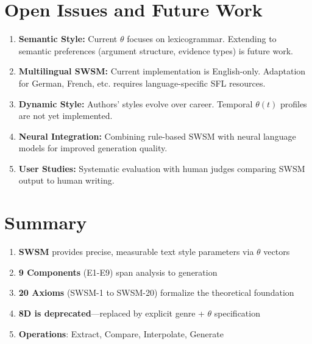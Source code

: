 \section{Open Issues and Future Work}
\label{sec:sw-open}

\begin{enumerate}
    \item \textbf{Semantic Style:} Current $\theta$ focuses on lexicogrammar. Extending to semantic preferences (argument structure, evidence types) is future work.
    \item \textbf{Multilingual SWSM:} Current implementation is English-only. Adaptation for German, French, etc. requires language-specific SFL resources.
    \item \textbf{Dynamic Style:} Authors' styles evolve over career. Temporal $\theta(t)$ profiles are not yet implemented.
    \item \textbf{Neural Integration:} Combining rule-based SWSM with neural language models for improved generation quality.
    \item \textbf{User Studies:} Systematic evaluation with human judges comparing SWSM output to human writing.
\end{enumerate}


\section{Summary}
\label{sec:sw-summary}

\begin{tcolorbox}[colback=gray!5!white, colframe=gray!75!black, title=Key Takeaways]
\begin{enumerate}
    \item \textbf{SWSM} provides precise, measurable text style parameters via $\theta$ vectors
    \item \textbf{9 Components} (E1-E9) span analysis to generation
    \item \textbf{20 Axioms} (SWSM-1 to SWSM-20) formalize the theoretical foundation
    \item \textbf{8D is deprecated}—replaced by explicit genre + $\theta$ specification
    \item \textbf{Operations}: Extract, Compare, Interpolate, Generate
\end{enumerate}
\end{tcolorbox}

